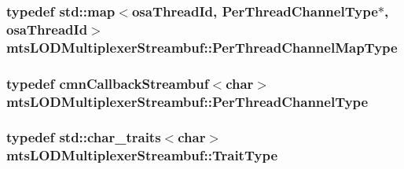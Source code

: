 \hypertarget{classmts_l_o_d_multiplexer_streambuf_aff1696a1ada12cd77decfe1deb5d8a63}{
\subsubsection[{Per\-Thread\-Channel\-Map\-Type}]{\setlength{\rightskip}{0pt plus 5cm}typedef std\-::map$<${\bf osa\-Thread\-Id}, {\bf Per\-Thread\-Channel\-Type}$\ast$, {\bf osa\-Thread\-Id}$>$ {\bf mts\-L\-O\-D\-Multiplexer\-Streambuf\-::\-Per\-Thread\-Channel\-Map\-Type}\hspace{0.3cm}{\ttfamily [protected]}}}\label{classmts_l_o_d_multiplexer_streambuf_aff1696a1ada12cd77decfe1deb5d8a63}
\hypertarget{classmts_l_o_d_multiplexer_streambuf_a945f4bdc4f4a79290018377ae3de68e9}{
\subsubsection[{Per\-Thread\-Channel\-Type}]{\setlength{\rightskip}{0pt plus 5cm}typedef {\bf cmn\-Callback\-Streambuf}$<$char$>$ {\bf mts\-L\-O\-D\-Multiplexer\-Streambuf\-::\-Per\-Thread\-Channel\-Type}}}\label{classmts_l_o_d_multiplexer_streambuf_a945f4bdc4f4a79290018377ae3de68e9}
\hypertarget{classmts_l_o_d_multiplexer_streambuf_aad2a9ad3c0067d2f8cde938845daa252}{
\subsubsection[{Trait\-Type}]{\setlength{\rightskip}{0pt plus 5cm}typedef std\-::char\-\_\-traits$<$char$>$ {\bf mts\-L\-O\-D\-Multiplexer\-Streambuf\-::\-Trait\-Type}}}\label{classmts_l_o_d_multiplexer_streambuf_aad2a9ad3c0067d2f8cde938845daa252}


